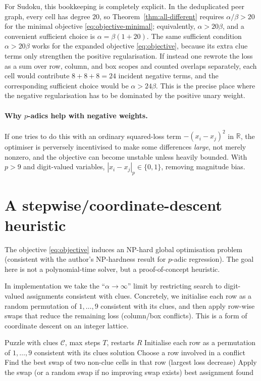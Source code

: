 \documentclass[11pt]{article}
\begin{document}
For Sudoku, this bookkeeping is completely explicit. In the deduplicated peer graph, every cell has degree \(20\), so Theorem~\ref{thm:all-different} requires \(\alpha/\beta>20\) for the minimal objective \eqref{eq:objective-minimal}; equivalently, \(\alpha>20\beta\), and a convenient sufficient choice is \(\alpha=\beta(1+20)\). The same sufficient condition \(\alpha>20\beta\) works for the expanded objective \eqref{eq:objective}, because its extra clue terms only strengthen the positive regularisation. If instead one rewrote the loss as a sum over row, column, and box scopes and counted overlaps separately, each cell would contribute \(8+8+8=24\) incident negative terms, and the corresponding sufficient choice would be \(\alpha>24\beta\). This is the precise place where the negative regularisation has to be dominated by the positive unary weight.

\paragraph{Why $p$-adics help with negative weights.}
If one tries to do this with an ordinary squared-loss term $-(x_i-x_j)^2$ in $\mathbb{R}$, the optimiser is perversely incentivised to make some differences \emph{large}, not merely nonzero, and the objective can become unstable unless heavily bounded. With $p>9$ and digit-valued variables, $|x_i-x_j|_p\in\{0,1\}$, removing magnitude bias.

\section{A stepwise/coordinate-descent heuristic}

The objective \eqref{eq:objective} induces an NP-hard global optimisation problem (consistent with the author's NP-hardness result for $p$-adic regression). The goal here is not a polynomial-time solver, but a proof-of-concept heuristic.

In implementation we take the ``$\alpha\to\infty$'' limit by restricting search to digit-valued assignments consistent with clues. Concretely, we initialise each row as a random permutation of $1,\dots,9$ consistent with its clues, and then apply row-wise swaps that reduce the remaining loss (column/box conflicts). This is a form of coordinate descent on an integer lattice.

\begin{algorithm}[t]
\caption{Row-swap stepwise regression (heuristic)}
\begin{algorithmic}[1]
\Require Puzzle with clues $\mathcal{C}$, max steps $T$, restarts $R$
    \State Initialise each row as a permutation of $1,\dots,9$ consistent with its clues
         \State \Return solution \EndIf
        \State Choose a row involved in a conflict
        \State Find the best swap of two non-clue cells in that row (largest loss decrease)
        \State Apply the swap (or a random swap if no improving swap exists)
    \EndFor
\EndFor
\State \Return best assignment found
\end{algorithmic}
\end{algorithm}
\end{document}
